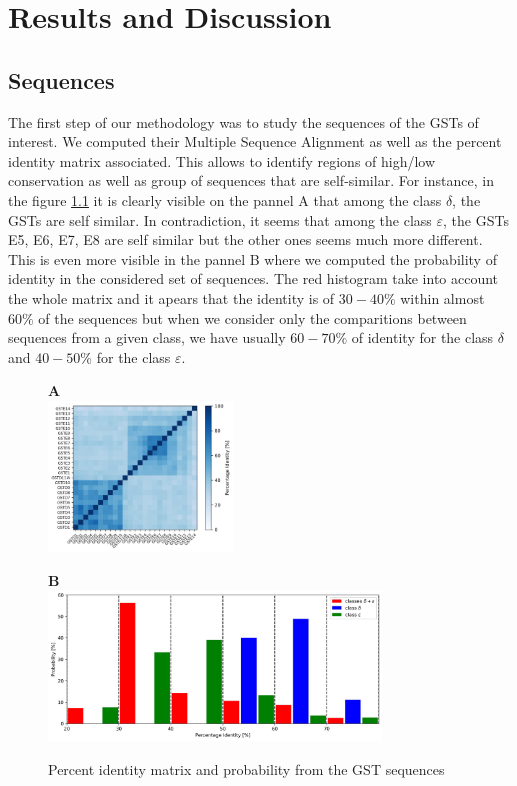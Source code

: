 \chapter{Results and Discussion}

\section{Sequences}
\noindent The first step of our methodology was to study the sequences of the GSTs of interest. We computed their Multiple Sequence Alignment as well as the percent identity matrix associated. This allows to identify regions of high/low conservation as well as group of sequences that are self-similar. For instance, in the figure \ref{Sequence and Structure matricies} it is clearly visible on the pannel A that among the class $\delta$, the GSTs are self similar. In contradiction, it seems that among the class $\varepsilon$, the GSTs E5, E6, E7, E8 are self similar but the other ones seems much more different. This is even more visible in the pannel B where we computed the probability  of identity in the considered set of sequences. The red histogram take into account the whole matrix and it apears that the identity is of $30-40\%$ within almost $60\%$ of the sequences but when we consider only the comparitions between sequences from a given class, we have usually $60-70\%$ of identity for the class $\delta$ and $40-50\%$ for the class $\varepsilon$.

\begin{figure}[H]
	\label{Sequence and Structure matricies}
	\begin{minipage}{.33\linewidth}
		\textbf{A}\\
		\includegraphics[height = 4cm]{figures/PercentID_matrix.jpg}
	\end{minipage}
	\begin{minipage}{.65\linewidth}
		\textbf{B}\\
		\includegraphics[height = 4cm]{figures/PercentID_proba.jpg}
	\end{minipage}
	\caption{Percent identity matrix and probability from the GST sequences}
\end{figure}

